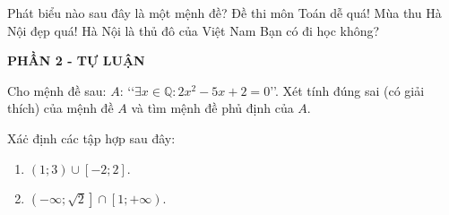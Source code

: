 \begin{ex}%
	Phát biểu nào sau đây là một mệnh đề?
	\choice
	{Đề thi môn Toán dễ quá!}
	{Mùa thu Hà Nội đẹp quá!}
	{\True Hà Nội là thủ đô của Việt Nam}
	{Bạn có đi học không?}
	\loigiai{}
\end{ex}

\begin{center}
	\textbf{PHẦN 2 - TỰ LUẬN}
\end{center}
\begin{bt}%
	Cho mệnh đề sau:  $A$: \lq\lq$ \exists x \in \mathbb{Q}: 2 x^2-5 x+2=0 $\rq\rq. Xét tính đúng sai (có giải thích) của mệnh đề $A$ và tìm mệnh đề phủ định của $A$.
\end{bt}
\begin{bt}%
	Xáċ định các tập hợp sau đây:
	\begin{enumerate}
		\item $(1 ; 3) \cup[-2 ; 2]$.
		\item $\left (-\infty ; \sqrt{2}\right ] \cap\left [1 ;+\infty\right )$.
	\end{enumerate}
	\loigiai{
		\begin{enumerate}
			\item $(1 ; 3) \cup[-2 ; 2]=[-2;3)$.
			\item $\left (-\infty ; \sqrt{2}\right ] \cap\left [1 ;+\infty \right )=\left[1;\sqrt 2\right]$.
		\end{enumerate}
	}
\end{bt}

